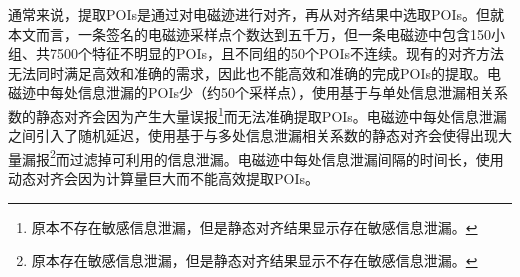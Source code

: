 {{{	
%	
%	
}
	
	通常来说，提取POIs是通过对电磁迹进行对齐，再从对齐结果中选取POIs。但就本文而言，一条签名的电磁迹采样点个数达到五千万，但一条电磁迹中包含150小组、共7500个特征不明显的POIs，且不同组的50个POIs不连续。现有的对齐方法无法同时满足高效和准确的需求，因此也不能高效和准确的完成POIs的提取。电磁迹中每处信息泄漏的POIs少（约50个采样点），使用基于与单处信息泄漏相关系数的静态对齐会因为产生大量误报\footnote{原本不存在敏感信息泄漏，但是静态对齐结果显示存在敏感信息泄漏。}而无法准确提取POIs。电磁迹中每处信息泄漏之间引入了随机延迟，使用基于与多处信息泄漏相关系数的静态对齐会使得出现大量漏报\footnote{原本存在敏感信息泄漏，但是静态对齐结果显示不存在敏感信息泄漏。}而过滤掉可利用的信息泄漏。电磁迹中每处信息泄漏间隔的时间长，使用动态对齐会因为计算量巨大而不能高效提取POIs。
	
}}
